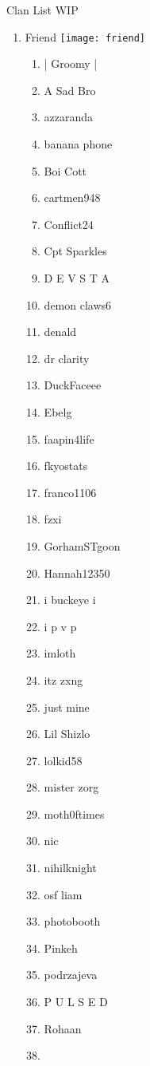 \documentclass{article}
\begin{document}
Clan List WIP
\begin{enumerate}[I]
  \item 
    Friend \texttt{[image: friend]}
    \begin{enumerate}[I]
      \item
	| Groomy |
      \item
	A Sad Bro
      \item
	azzaranda
      \item
	banana phone
      \item
	Boi Cott
      \item
	cartmen948
      \item
	Conflict24
      \item
	Cpt Sparkles
      \item
	D E V S T A
      \item
	demon claws6
      \item
	denald
      \item
	dr clarity
      \item
	DuckFaceee
      \item
	Ebelg
      \item
	faapin4life
      \item
	fkyostats
      \item
	franco1106
      \item
	fzxi
      \item
	GorhamSTgoon
      \item
	Hannah12350
      \item
	i buckeye i
      \item
	i p v p
      \item
	imloth
      \item
	itz zxng
      \item
	just mine
      \item
	Lil Shizlo
      \item
	lolkid58
      \item
	mister zorg
      \item
	moth0ftimes
      \item
	nic
      \item
	nihilknight
      \item
	osf liam
      \item
	photobooth
      \item
	Pinkeh
      \item
	podrzajeva
      \item
	P U L S E D
      \item
	Rohaan
      \item

\end{enumerate}
\end{enumerate}
\end{document}
